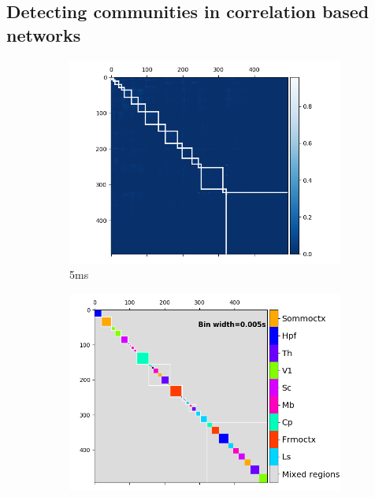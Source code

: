 \documentclass[a4paper,12pt]{article}
\theoremstyle{definition}
\begin{document}
  \subsection{Detecting communities in correlation based networks}

  \begin{figure}
    \begin{subfigure}[h]{0.5\linewidth}
      \includegraphics[width=\linewidth]{figures/Krebs_0p005_rectified_cons_cluster_map.png}
      \caption{5ms}
      \label{fig:consensus_cluster_5ms}
    \end{subfigure}
    \begin{subfigure}[h]{0.5\linewidth}
      \includegraphics[width=\linewidth]{figures/Krebs_0p005_regional_cluster_map.png}

\end{subfigure}
\end{figure}
\end{document}
